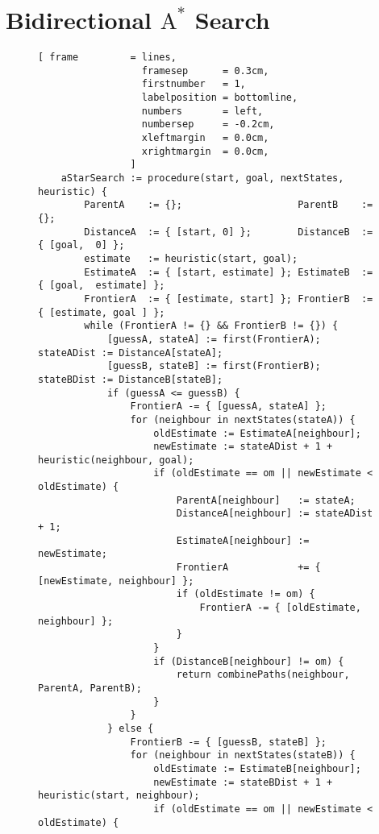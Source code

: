 \section{Bidirectional $\mathrm{A}^*$ Search}
\begin{figure}[!ht]
\centering
\begin{Verbatim}[ frame         = lines, 
                  framesep      = 0.3cm, 
                  firstnumber   = 1,
                  labelposition = bottomline,
                  numbers       = left,
                  numbersep     = -0.2cm,
                  xleftmargin   = 0.0cm,
                  xrightmargin  = 0.0cm,
                ]
    aStarSearch := procedure(start, goal, nextStates, heuristic) {
        ParentA    := {};                    ParentB    := {};                    
        DistanceA  := { [start, 0] };        DistanceB  := { [goal,  0] };
        estimate   := heuristic(start, goal);
        EstimateA  := { [start, estimate] }; EstimateB  := { [goal,  estimate] };  
        FrontierA  := { [estimate, start] }; FrontierB  := { [estimate, goal ] };  
        while (FrontierA != {} && FrontierB != {}) {
            [guessA, stateA] := first(FrontierA); stateADist := DistanceA[stateA];
            [guessB, stateB] := first(FrontierB); stateBDist := DistanceB[stateB];
            if (guessA <= guessB) {
                FrontierA -= { [guessA, stateA] };
                for (neighbour in nextStates(stateA)) {
                    oldEstimate := EstimateA[neighbour];
                    newEstimate := stateADist + 1 + heuristic(neighbour, goal);
                    if (oldEstimate == om || newEstimate < oldEstimate) {
                        ParentA[neighbour]   := stateA;
                        DistanceA[neighbour] := stateADist + 1;
                        EstimateA[neighbour] := newEstimate;
                        FrontierA            += { [newEstimate, neighbour] };
                        if (oldEstimate != om) { 
                            FrontierA -= { [oldEstimate, neighbour] }; 
                        }
                    }
                    if (DistanceB[neighbour] != om) {
                        return combinePaths(neighbour, ParentA, ParentB);
                    }
                }
            } else {
                FrontierB -= { [guessB, stateB] };
                for (neighbour in nextStates(stateB)) {
                    oldEstimate := EstimateB[neighbour];
                    newEstimate := stateBDist + 1 + heuristic(start, neighbour);
                    if (oldEstimate == om || newEstimate < oldEstimate) {

\end{Verbatim}
\end{figure}
